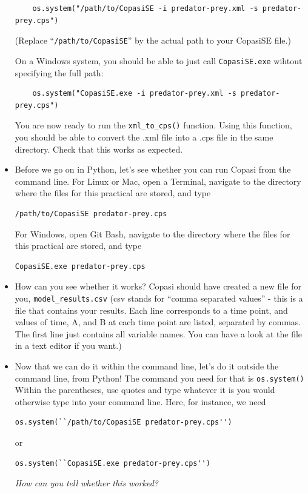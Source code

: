 \documentclass[pdflatex,a4paper]{article}
\begin{document}
\begin{itemize}
\begin{lstlisting}
    os.system("/path/to/CopasiSE -i predator-prey.xml -s predator-prey.cps")
\end{lstlisting}

(Replace ``\verb=/path/to/CopasiSE='' by the actual path to your CopasiSE file.)

On a Windows system, you should be able to just call \verb=CopasiSE.exe= wihtout specifying the full path: 

\begin{lstlisting}
    os.system("CopasiSE.exe -i predator-prey.xml -s predator-prey.cps")
\end{lstlisting}

You are now ready to run the \verb=xml_to_cps()= function. Using this function, you should be able to convert the .xml file into a .cps file in the same directory. Check that this works as expected.

\item

Before we go on in Python, let's see whether you can run Copasi from the command line. For Linux or Mac, open a Terminal, navigate to the directory where the files for this practical are stored, and type

\begin{lstlisting}
/path/to/CopasiSE predator-prey.cps
\end{lstlisting}

For Windows, open Git Bash, navigate to the directory where the files for this practical are stored, and type

\begin{lstlisting}
CopasiSE.exe predator-prey.cps
\end{lstlisting}


\item
How can you see whether it works? Copasi should have created a new file for you, \verb=model_results.csv= (csv stands for ``comma separated values'' - this is a file that contains your results. Each line corresponds to a time point, and values of time, A, and B at each time point are listed, separated by commas. The first line just contains all variable names. You can have a look at the file in a text editor if you want.)

\item
Now that we can do it within the command line, let's do it outside the command line, from Python! The command you need for that is \verb=os.system()= Within the parentheses, use quotes and type whatever it is you would otherwise type into your command line. Here, for instance, we need 

\begin{lstlisting}
os.system(``/path/to/CopasiSE predator-prey.cps'')
\end{lstlisting}

or 

\begin{lstlisting}
os.system(``CopasiSE.exe predator-prey.cps'')
\end{lstlisting}

\emph{How can you tell whether this worked?}

\end{itemize}
\end{document}
